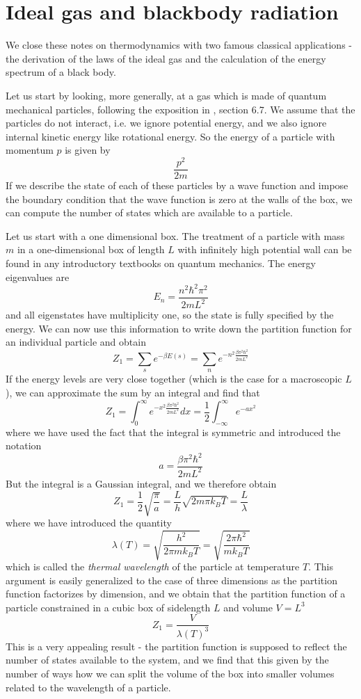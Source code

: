 \documentclass[a4paper, draft]{report}
\numberwithin{section}{chapter}
\numberwithin{equation}{chapter}
\theoremstyle{own}
\theoremstyle{remark}
\begin{document}
\section{Ideal gas and blackbody radiation}

We close these notes on thermodynamics with two famous classical applications - the derivation of the laws of the ideal gas and the calculation of the energy spectrum of a black body.

Let us start by looking, more generally, at a gas which is made of quantum mechanical particles, following the exposition in \cite{Schroeder}, section 6.7.  We assume that the particles do not interact, i.e. we ignore potential energy, and we also ignore internal kinetic energy like rotational energy. So the energy of a particle with momentum $p$ is given by
$$
\frac{p^2}{2m}
$$
If we describe the state of each of these particles by a wave function and impose the boundary condition that the wave function is zero at the walls of the box, we can compute the number of states which are available to a particle. 

Let us start with a one dimensional box. The treatment of a particle with mass $m$ in a one-dimensional box of length $L$ with infinitely high potential wall can be found in any introductory textbooks on quantum mechanics. The energy eigenvalues are
$$
E_n = \frac{n^2 \hbar^2 \pi^2}{2m L^2}
$$
and all eigenstates have multiplicity one, so the state is fully specified by the energy. 
We can now use this information to write down the partition function for an individual particle and obtain
$$
Z_1 = \sum_s e^{-\beta E(s)} = \sum_n e^{- n^2 \frac{\beta \pi^2 \hbar^2}{2mL^2}} 
$$
If the energy levels are very close together (which is the case for a macroscopic $L$), we can approximate the sum by an integral and find that
$$
Z_1 = \int_0^\infty e^{-x^2 \frac{\beta \pi^2 \hbar^2}{2mL^2}} dx = 
\frac{1}{2}  \int_{-\infty}^\infty e^{-ax^2}
$$
where we have used the fact that the integral is symmetric and introduced the notation
$$
a = \frac{\beta \pi^2 \hbar^2}{2mL^2}
$$
But the integral is a Gaussian integral, and we therefore obtain
$$
Z_1 = \frac{1}{2} \sqrt{\frac{\pi}{a}} = \frac{L}{h} \sqrt{2m\pi k_B T} = \frac{L}{\lambda}
$$
where we have introduced the quantity 
$$
\lambda(T) = \sqrt{\frac{h^2}{2\pi m k_B T}} = \sqrt{\frac{2\pi \hbar^2}{m k_B T}}
$$
which is called the {\em thermal wavelength} of the particle at temperature $T$. This argument is easily generalized to the case of three dimensions as the partition function factorizes by dimension, and we obtain that the partition function of a particle constrained in a cubic box of sidelength $L$ and volume $V = L^3$
$$
Z_1 = \frac{V} {\lambda(T)^3}
$$
This is a very appealing result - the partition function is supposed to reflect the number of states available to the system, and we find that this given by the number of ways how we can split the volume of the box into smaller volumes related to the wavelength of a particle.
\end{document}
